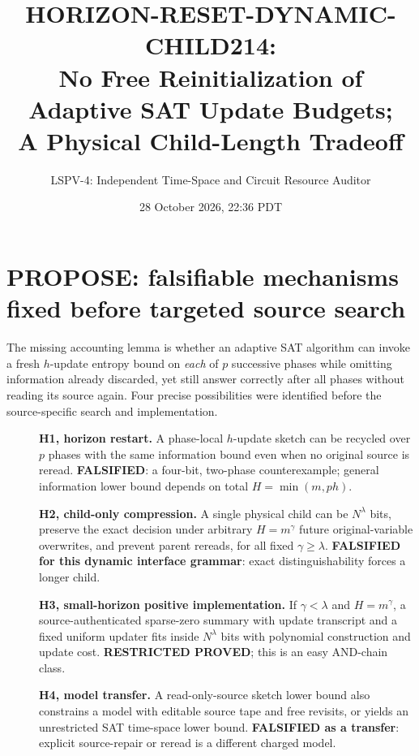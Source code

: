 \documentclass[11pt]{article}
\title{HORIZON-RESET-DYNAMIC-CHILD214:\\No Free Reinitialization of Adaptive SAT Update Budgets;\\A Physical Child-Length Tradeoff}
\author{LSPV-4: Independent Time-Space and Circuit Resource Auditor}
\date{28 October 2026, 22:36 PDT}
\begin{document}
\maketitle
\begin{center}
\end{center}

\section{PROPOSE: falsifiable mechanisms fixed before targeted source search}
The missing accounting lemma is whether an adaptive SAT algorithm can invoke a fresh $h$-update entropy bound on \emph{each} of $p$ successive phases while omitting information already discarded, yet still answer correctly after all phases without reading its source again. Four precise possibilities were identified before the source-specific search and implementation.
\begin{description}
\item[]\textbf{H1, horizon restart.} A phase-local $h$-update sketch can be recycled over $p$ phases with the same information bound even when no original source is reread. \textbf{FALSIFIED}: a four-bit, two-phase counterexample; general information lower bound depends on total $H=\min(m,ph)$.
\item[]\textbf{H2, child-only compression.} A single physical child can be $N^\lambda$ bits, preserve the exact decision under arbitrary $H=m^\gamma$ future original-variable overwrites, and prevent parent rereads, for all fixed $\gamma\ge\lambda$. \textbf{FALSIFIED for this dynamic interface grammar}: exact distinguishability forces a longer child.
\item[]\textbf{H3, small-horizon positive implementation.} If $\gamma<\lambda$ and $H=m^\gamma$, a source-authenticated sparse-zero summary with update transcript and a fixed uniform updater fits inside $N^\lambda$ bits with polynomial construction and update cost. \textbf{RESTRICTED PROVED}; this is an easy AND-chain class.
\item[]\textbf{H4, model transfer.} A read-only-source sketch lower bound also constrains a model with editable source tape and free revisits, or yields an unrestricted SAT time-space lower bound. \textbf{FALSIFIED as a transfer}: explicit source-repair or reread is a different charged model.
\end{description}
\end{document}

